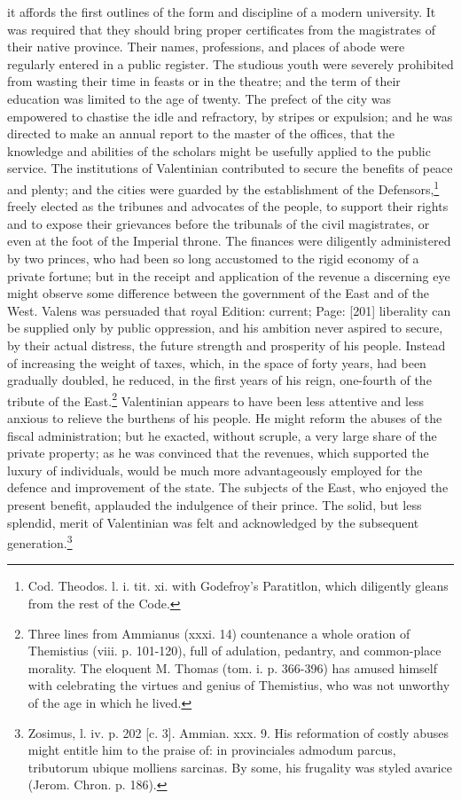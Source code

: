 it affords the first outlines of the form and discipline of a modern university. It was required that they should bring proper certificates from the magistrates of their native province. Their names, professions, and places of abode were regularly entered in a public register. The studious youth were severely prohibited from wasting their time in feasts or in the theatre; and the term of their education was limited to the age of twenty. The prefect of the city was empowered to chastise the idle and refractory, by stripes or expulsion; and he was directed to make an annual report to the master of the offices, that the knowledge and abilities of the scholars might be usefully applied to the public service. The institutions of Valentinian contributed to secure the benefits of peace and plenty; and the cities were guarded by the establishment of the Defensors,\footnote{Cod. Theodos. l. i. tit. xi. with Godefroy\texthebrew{}’s Paratitlon, which diligently gleans from the rest of the Code.} freely elected as the tribunes and advocates of the people, to support their rights and to expose their grievances before the tribunals of the civil magistrates, or even at the foot of the Imperial throne. The finances were diligently administered by two princes, who had been so long accustomed to the rigid economy of a private fortune; but in the receipt and application of the revenue a discerning eye might observe some difference between the government of the East and of the West. Valens was persuaded that royal Edition: current; Page: [201] liberality can be supplied only by public oppression, and his ambition never aspired to secure, by their actual distress, the future strength and prosperity of his people. Instead of increasing the weight of taxes, which, in the space of forty years, had been gradually doubled, he reduced, in the first years of his reign, one-fourth of the tribute of the East.\footnote{Three lines from Ammianus (xxxi. 14) countenance a whole oration of Themistius (viii. p. 101-120), full of adulation, pedantry, and common-place morality. The eloquent M. Thomas (tom. i. p. 366-396) has amused himself with celebrating the virtues and genius of Themistius, who was not unworthy of the age in which he lived.} Valentinian appears to have been less attentive and less anxious to relieve the burthens of his people. He might reform the abuses of the fiscal administration; but he exacted, without scruple, a very large share of the private property; as he was convinced that the revenues, which supported the luxury of individuals, would be much more advantageously employed for the defence and improvement of the state. The subjects of the East, who enjoyed the present benefit, applauded the indulgence of their prince. The solid, but less splendid, merit of Valentinian was felt and acknowledged by the subsequent generation.\footnote{Zosimus, l. iv. p. 202 [c. 3]. Ammian. xxx. 9. His reformation of costly abuses might entitle him to the praise of: in provinciales admodum parcus, tributorum ubique molliens sarcinas. By some, his frugality was styled avarice (Jerom. Chron. p. 186).}


